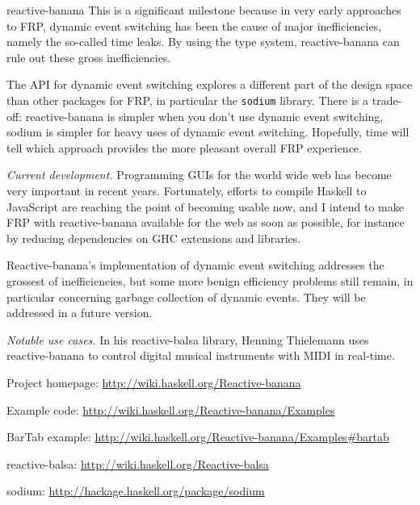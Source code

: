 \begin{hcarentry}[updated]{reactive-banana}
This is a significant milestone because in very early approaches to FRP, dynamic event switching has been the cause of major inefficiencies, namely the so-called time leaks. By using the type system, reactive-banana can rule out these gross inefficiencies.

The API for dynamic event switching explores a different part of the design space than other packages for FRP, in particular the \verb!sodium! library. There is a trade-off: reactive-banana is simpler when you don't use dynamic event switching, sodium is simpler for heavy uses of dynamic event switching. Hopefully, time will tell which approach provides the more pleasant overall FRP experience.

\emph{Current development.}
Programming GUIs for the world wide web has become very important in recent years. Fortunately, efforts to compile Haskell to JavaScript are reaching the point of becoming usable now, and I intend to make FRP with reactive-banana available for the web as soon as possible, for instance by reducing dependencies on GHC extensions and libraries.

Reactive-banana's implementation of dynamic event switching addresses the grossest of inefficiencies, but some more benign efficiency problems still remain, in particular concerning garbage collection of dynamic events. They will be addressed in a future version.

\emph{Notable use cases.} In his reactive-balsa library, Henning Thielemann uses reactive-banana to control digital musical instruments with MIDI in real-time.

\FurtherReading
\begin{compactitem}
\item Project homepage: \url{http://wiki.haskell.org/Reactive-banana}
\item Example code: \url{http://wiki.haskell.org/Reactive-banana/Examples}
\item BarTab example: \url{http://wiki.haskell.org/Reactive-banana/Examples#bartab}
\item reactive-balsa: \url{http://wiki.haskell.org/Reactive-balsa}
\item sodium: \url{http://hackage.haskell.org/package/sodium}
\end{compactitem}
\end{hcarentry}
